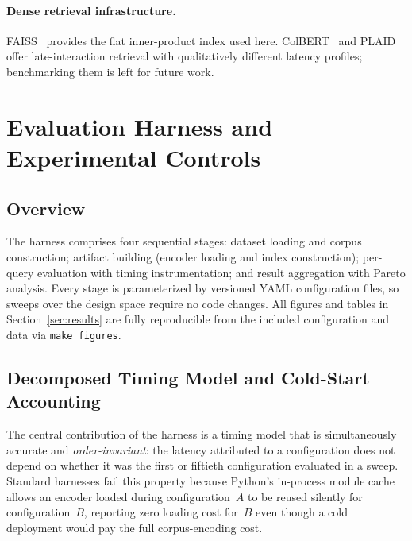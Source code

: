\documentclass[11pt,a4paper]{article}
\begin{document}
\paragraph{Dense retrieval infrastructure.}
FAISS~\citep{johnson2019faiss} provides the flat inner-product index used here.
ColBERT~\citep{khattab2020colbert} and PLAID~\citep{santhanam2022plaid} offer
late-interaction retrieval with qualitatively different latency profiles;
benchmarking them is left for future work.

\section{Evaluation Harness and Experimental Controls}
\label{sec:harness}

\subsection{Overview}

The harness comprises four sequential stages: dataset loading and corpus
construction; artifact building (encoder loading and index construction);
per-query evaluation with timing instrumentation; and result aggregation with
Pareto analysis.
Every stage is parameterized by versioned YAML configuration files, so sweeps
over the design space require no code changes.
All figures and tables in Section~\ref{sec:results} are fully reproducible from
the included configuration and data via \texttt{make figures}.

\subsection{Decomposed Timing Model and Cold-Start Accounting}
\label{sec:timing}

The central contribution of the harness is a timing model that is simultaneously
accurate and \emph{order-invariant}: the latency attributed to a configuration
does not depend on whether it was the first or fiftieth configuration evaluated
in a sweep.
Standard harnesses fail this property because Python's in-process module cache
allows an encoder loaded during configuration~$A$ to be reused silently for
configuration~$B$, reporting zero loading cost for~$B$ even though a cold
deployment would pay the full corpus-encoding cost.
\end{document}
